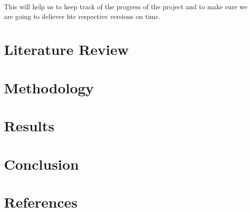 \documentclass[12pt]{article}
\begin{document}
This will help us to keep track of the progress of the project and to make sure
we are going to deliever hte respective versions on time.

\newpage
\section{Literature Review}

\newpage

\section{Methodology}

\newpage

\section{Results}

\newpage

\section{Conclusion}

\newpage

\section{References}
\nocite{*}


\end{document}

